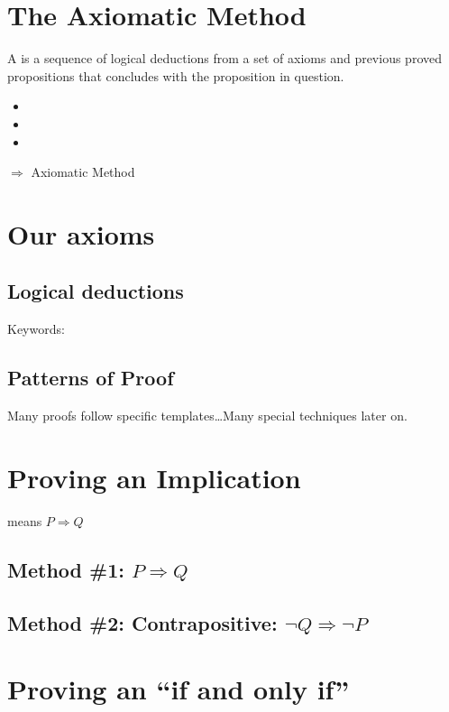 \section{The Axiomatic Method}
\begin{definition}
    A  is a sequence of logical deductions from a set of axioms
    and previous proved propositions that concludes with the proposition in question.
\end{definition}
\begin{itemize}
    \item {}
    \item {}
    \item {} 
\end{itemize}
$\Rightarrow$ Axiomatic Method

\section{Our axioms}
\subsection{Logical deductions}
Keywords: 
\subsection{Patterns of Proof}
Many proofs follow specific templates\ldots Many special techniques later on.

\section{Proving an Implication}
\begin{definition}
     means $P \Rightarrow Q$
\end{definition}
\subsection{Method \#1: \texorpdfstring{$P \Rightarrow Q$}{TEXT}}
\subsection{Method \#2: Contrapositive: \texorpdfstring{$\neg Q \Rightarrow \neg P$}{TEXT}}

\section{Proving an ``if and only if''}
